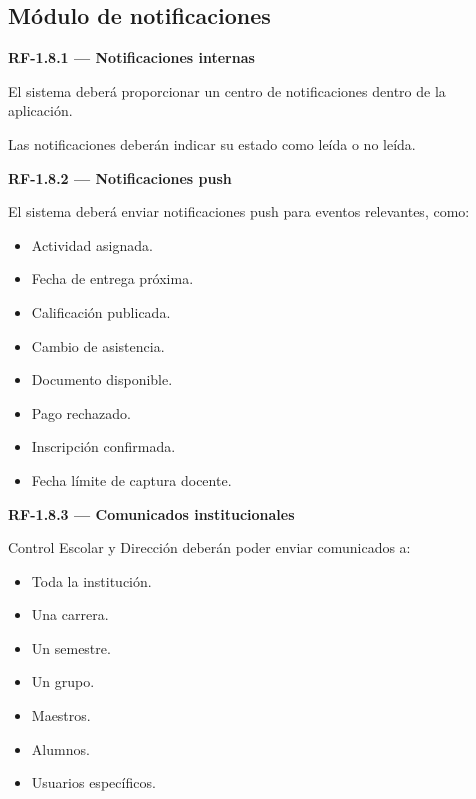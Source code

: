 \documentclass[12pt,a4paper]{article}
\newcommand{\RF}[1]{\textbf{\color{primary}RF-#1}}
\newenvironment{requisito}[1]
{
\begin{center}
\begin{minipage}{0.96\textwidth}
\colorbox{requirement}{
\begin{minipage}{0.94\textwidth}
\textbf{#1}
\end{minipage}
}
\vspace{2mm}
}
{
\end{minipage}
\end{center}
}
\begin{document}
\subsection{Módulo de notificaciones}

\begin{requisito}{\RF{1.8.1} --- Notificaciones internas}
El sistema deberá proporcionar un centro de notificaciones dentro de la
aplicación.

Las notificaciones deberán indicar su estado como leída o no leída.
\end{requisito}

\begin{requisito}{\RF{1.8.2} --- Notificaciones push}
El sistema deberá enviar notificaciones push para eventos relevantes, como:

\begin{itemize}[leftmargin=*]
\item Actividad asignada.
\item Fecha de entrega próxima.
\item Calificación publicada.
\item Cambio de asistencia.
\item Documento disponible.
\item Pago rechazado.
\item Inscripción confirmada.
\item Fecha límite de captura docente.
\end{itemize}
\end{requisito}

\begin{requisito}{\RF{1.8.3} --- Comunicados institucionales}
Control Escolar y Dirección deberán poder enviar comunicados a:

\begin{itemize}[leftmargin=*]
\item Toda la institución.
\item Una carrera.
\item Un semestre.
\item Un grupo.
\item Maestros.
\item Alumnos.
\item Usuarios específicos.
\end{itemize}
\end{requisito}

\end{document}
